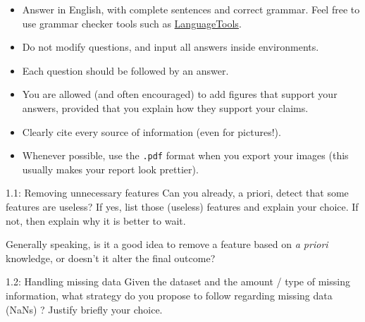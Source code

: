 \documentclass [a4paper, 12pt] {article}
\begin{document}
    \begin{itemize}
        \item Answer in English, with complete sentences and correct grammar. Feel free to use grammar checker tools such as \href{https://languagetool.org/fr}{LanguageTools}.
        \item Do not modify questions, and input all answers inside  environments.
        \item Each question should be followed by an answer.
        \item You are allowed (and often encouraged) to add figures that support your answers, provided that you explain how they support your claims.
        \item Clearly cite every source of information (even for pictures!).
        \item Whenever possible, use the \texttt{.pdf} format when you export your images (this usually makes your report look prettier).
    \end{itemize}

    {
    \hypersetup{allcolors=black}
    }   
    \clearpage

\renewcommand{\arraystretch}{0.84}

\begin{question}{1.1: Removing unnecessary features}
    Can you already, a priori, detect that some features are useless? If yes, list those (useless) features and explain your choice. If not, then explain why it is better to wait.

    Generally speaking, is it a good idea to remove a feature based on \emph{a priori} knowledge, or doesn't it alter the final outcome?
\end{question}
\begin{answer}\color{blue} 
\end{answer}

\begin{question}{1.2: Handling missing data}
    Given the dataset and the amount / type of missing information, what strategy do you propose to follow regarding missing data (NaNs) ? Justify briefly your choice.
\end{question}
\begin{answer}\color{blue} 
\end{answer}
\end{document}
